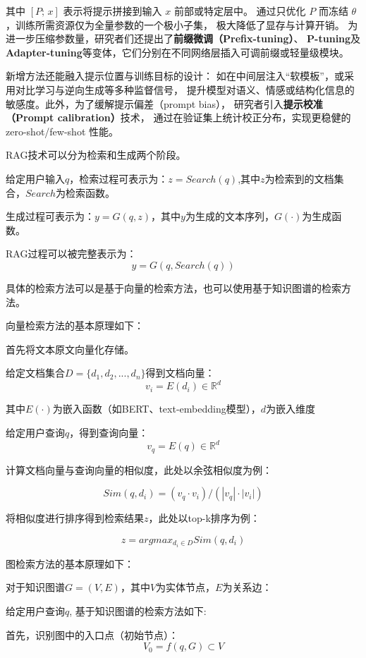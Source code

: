 \documentclass{xmu}
\begin{document}
其中 $[P;\,x]$ 表示将提示拼接到输入 $x$ 前部或特定层中。
通过只优化 $P$ 而冻结 $\theta$，训练所需资源仅为全量参数的一个极小子集，
极大降低了显存与计算开销。
为进一步压缩参数量，研究者们还提出了{\bf 前缀微调（Prefix-tuning）}、
{\bf P-tuning}及{\bf Adapter-tuning}等变体，它们分别在不同网络层插入可调前缀或轻量级模块。

新增方法还能融入提示位置与训练目标的设计：
如在中间层注入“软模板”，或采用对比学习与逆向生成等多种监督信号，
提升模型对语义、情感或结构化信息的敏感度。此外，为了缓解提示偏差（prompt bias），
研究者引入{\bf 提示校准（Prompt calibration）}技术，
通过在验证集上统计校正分布，实现更稳健的 zero-shot/few-shot 性能。

RAG技术可以分为检索和生成两个阶段。

给定用户输入$q$，检索过程可表示为：$z = Search(q)$,其中$z$为检索到的文档集合，$Search$为检索函数。

生成过程可表示为：$y = G(q,z)$，其中$y$为生成的文本序列，$G(·)$为生成函数。

RAG过程可以被完整表示为：
$$
y = G(q,Search(q))
$$

具体的检索方法可以是基于向量的检索方法，也可以使用基于知识图谱的检索方法。

向量检索方法的基本原理如下：

首先将文本原文向量化存储。

给定文档集合$D=\{d_1,d_2,...,d_n\}$得到文档向量：
$$
v_i = E(d_i) \in \mathbb{R}^d
$$

其中$E(·)$为嵌入函数（如BERT、text-embedding模型），$d$为嵌入维度

给定用户查询$q$，得到查询向量：
$$
v_q = E(q) \in \mathbb{R}^d
$$

计算文档向量与查询向量的相似度，此处以余弦相似度为例：

$$
Sim(q,d_i) = (v_q \cdot v_i)/(|v_q|\cdot|v_i|)
$$

将相似度进行排序得到检索结果$z$，此处以top-k排序为例：

$$
z = argmax_{d_i \in D} Sim(q,d_i)
$$

图检索方法的基本原理如下：

对于知识图谱$G=(V,E)$，其中$V$为实体节点，$E$为关系边：

给定用户查询$q$, 基于知识图谱的检索方法如下:

首先，识别图中的入口点（初始节点）：
$$
V_0 = f(q, G) \subset V
$$
\end{document}
